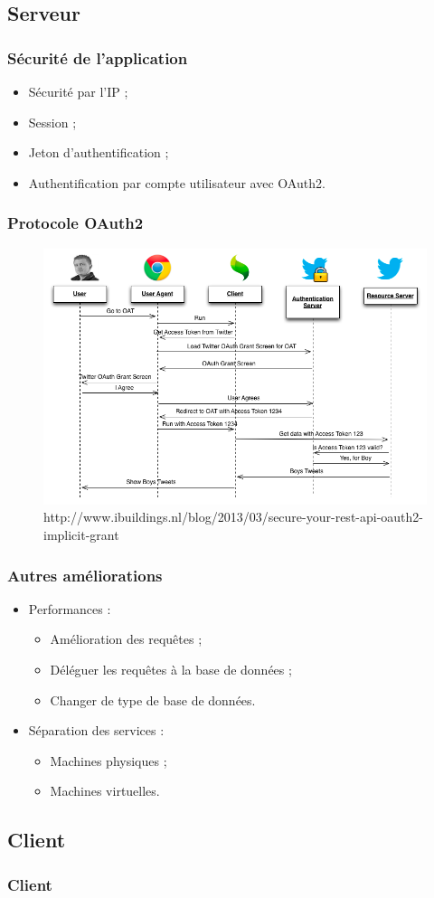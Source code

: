 \subsection{Serveur}
	\begin{frame}
		\frametitle{Sécurité de l'application}
		\begin{itemize}
			\item Sécurité par l'IP ;
			\item Session ;
			\item Jeton d'authentification ;
			\item Authentification par compte utilisateur avec OAuth2.
		\end{itemize}
	\end{frame}

	\begin{frame}
		\frametitle{Protocole OAuth2}
		\begin{figure}[H]
			\centering
			\includegraphics[width=1\textwidth]{images/oauth2.png}
			\caption{http://www.ibuildings.nl/blog/2013/03/secure-your-rest-api-oauth2-implicit-grant}
		\end{figure}

	\end{frame}

	\begin{frame}
		\frametitle{Autres améliorations}
		\begin{itemize}
			\item Performances :
				\begin{itemize}
					\item Amélioration des requêtes ;
					\item Déléguer les requêtes à la base de données ;
					\item Changer de type de base de données.
				\end{itemize}
			\item Séparation des services :
				\begin{itemize}
					\item Machines physiques ;
					\item Machines virtuelles.
				\end{itemize}
		\end{itemize}
	\end{frame}

\subsection{Client}
	\begin{frame}
		\frametitle{Client}
	\end{frame}
